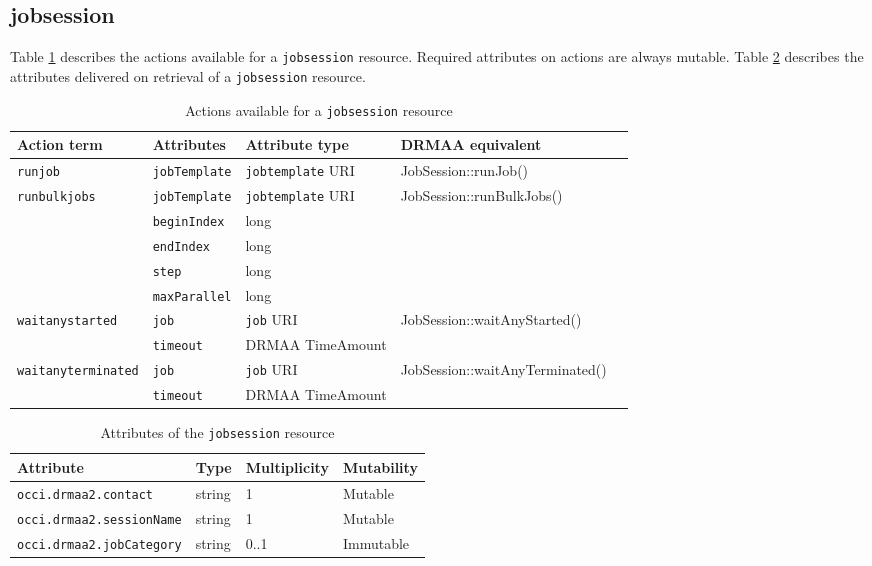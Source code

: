 \documentclass[10pt]{article}
\newcommand{\h}[1]{\lstinline|#1|}
\begin{document}
\subsection{jobsession}

Table \ref{tab:jobsessionactions} describes the actions available for a \h{jobsession} resource. Required attributes on actions are always mutable. Table \ref{tab:jobsessionattributes} describes the attributes delivered on retrieval of a \h{jobsession} resource.

\begin{table}[ht]
\centering
\begin{tabularx}{\textwidth}{|l|l|l|X|l|}
\hline
Action term           & Attributes          & Attribute type      & DRMAA equivalent \\
\hline
\h{runjob}            & \h{jobTemplate}     & \h{jobtemplate} URI & JobSession::runJob() \\
\h{runbulkjobs}       & \h{jobTemplate}     & \h{jobtemplate} URI & JobSession::runBulkJobs() \\
                      & \h{beginIndex}      & long                & \\
                      & \h{endIndex}        & long                & \\
                      & \h{step}            & long                & \\
                      & \h{maxParallel}     & long                & \\
\h{waitanystarted}    & \h{job}             & \h{job} URI         & JobSession::waitAnyStarted()\\
                      & \h{timeout}         & DRMAA TimeAmount    & \\
\h{waitanyterminated} & \h{job}             & \h{job} URI         & JobSession::waitAnyTerminated()\\
                      & \h{timeout}         & DRMAA TimeAmount    & \\
\hline
\end{tabularx}
\caption{Actions available for a \h{jobsession} resource}
\label{tab:jobsessionactions}
\end{table}

\begin{table}[ht]
\centering
\begin{tabularx}{\textwidth}{|l|X|X|X|}
\hline
Attribute                   & Type         & Multiplicity & Mutability \\
\hline
\h{occi.drmaa2.contact}     & string       & 1            & Mutable    \\ %
\h{occi.drmaa2.sessionName} & string       & 1            & Mutable    \\ %
\h{occi.drmaa2.jobCategory} & string       & 0..1         & Immutable  \\ %
\hline
\end{tabularx}
\caption{Attributes of the \h{jobsession} resource}
\label{tab:jobsessionattributes}
\end{table}
\end{document}
